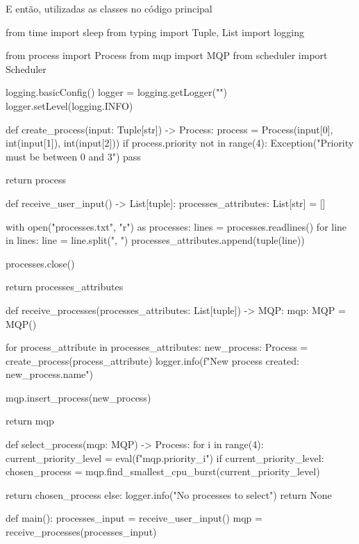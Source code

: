     E então, utilizadas as classes no código principal
    \begin{pycode}
    from time import sleep
    from typing import Tuple, List 
    import logging

    from process import Process
    from mqp import MQP
    from scheduler import Scheduler

    logging.basicConfig()
    logger = logging.getLogger("")
    logger.setLevel(logging.INFO)


    def create_process(input: Tuple[str]) -> Process:
            process = Process(input[0], int(input[1]), int(input[2]))
            if process.priority not in range(4):
                Exception("Priority must be between 0 and 3")
                pass

            return process


    def receive_user_input() -> List[tuple]:
        processes_attributes: List[str] = []

        with open("processes.txt", "r") as processes:
            lines = processes.readlines()
            for line in lines:
                line = line.split(", ")
                processes_attributes.append(tuple(line))

            processes.close()

        return processes_attributes

        
    def receive_processes(processes_attributes: List[tuple]) -> MQP:
        mqp: MQP = MQP()
        
        for process_attribute in processes_attributes:
            new_process: Process = create_process(process_attribute)
            logger.info(f"New process created: {new_process.name}")

            mqp.insert_process(new_process)

        return mqp



    def select_process(mqp: MQP) -> Process:
        for i in range(4):
            current_priority_level = eval(f"mqp.priority_{i}")
            if current_priority_level:
                chosen_process = mqp.find_smallest_cpu_burst(current_priority_level)
        
                return chosen_process
        else:
            logger.info("No processes to select")
            return None


    def main():
        processes_input = receive_user_input()
        mqp = receive_processes(processes_input)


\end{pycode}
